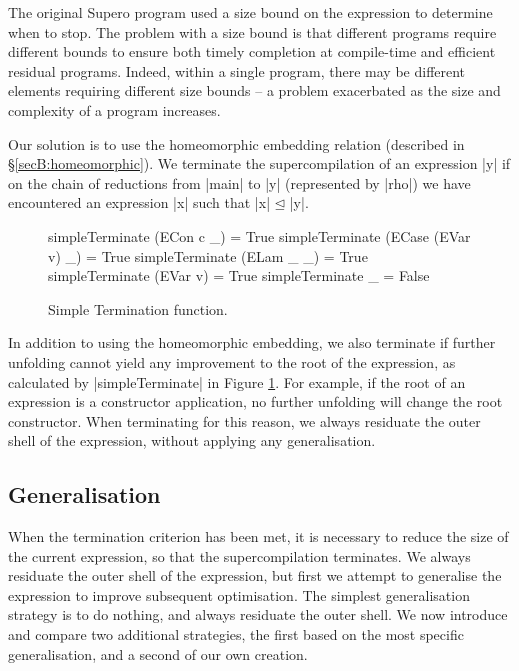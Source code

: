 The original Supero program used a size bound on the expression to determine when to stop. The problem with a size bound is that different programs require different bounds to ensure both timely completion at compile-time and efficient residual programs. Indeed, within a single program, there may be different elements requiring different size bounds -- a problem exacerbated as the size and complexity of a program increases.

Our solution is to use the homeomorphic embedding relation (described in \S\ref{secB:homeomorphic}). We terminate the supercompilation of an expression |y| if on the chain of reductions from |main| to |y| (represented by |rho|) we have encountered an expression |x| such that |x| $\unlhd$ |y|.

\begin{figure}
\begin{code}
simpleTerminate (ECon c _)          = True
simpleTerminate (ECase (EVar v) _)  = True
simpleTerminate (ELam _ _)          = True
simpleTerminate (EVar v)            = True
simpleTerminate _ = False
\end{code}
\caption{Simple Termination function.}
\label{figS:simpleterm}
\end{figure}

In addition to using the homeomorphic embedding, we also terminate if further unfolding cannot yield any improvement to the root of the expression, as calculated by |simpleTerminate| in Figure \ref{figS:simpleterm}. For example, if the root of an expression is a constructor application, no further unfolding will change the root constructor. When terminating for this reason, we always residuate the outer shell of the expression, without applying any generalisation.

\subsection{Generalisation}

When the termination criterion has been met, it is necessary to reduce the size of the current expression, so that the supercompilation terminates. We always residuate the outer shell of the expression, but first we attempt to generalise the expression to improve subsequent optimisation. The simplest generalisation strategy is to do nothing, and always residuate the outer shell. We now introduce and compare two additional strategies, the first based on the most specific generalisation, and a second of our own creation.

